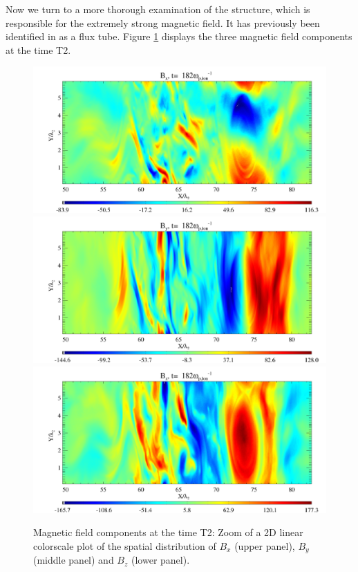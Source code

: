 \documentclass[structabstract]{aa}
\begin{document}
Now we turn to a more thorough examination of the structure, which is responsible for the extremely strong
magnetic field. It has previously been identified in  as a flux tube. Figure \ref{FigZoomBT2} displays the three magnetic field components 
at the time T2.
\begin{figure}[t]
\centering
\includegraphics[width=\columnwidth]{1529414a.png}
\includegraphics[width=\columnwidth]{1529414b.png}
\includegraphics[width=\columnwidth]{1529414c.png}
\caption{Magnetic field components at the time T2: Zoom of a 2D linear colorscale plot of the spatial 
distribution of $B_x$ (upper panel), $B_y$ (middle panel) and $B_z$ (lower panel).}\label{FigZoomBT2}
\end{figure}
\end{document}
